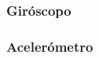 \begin{frame}
    \frametitle{Giróscopo}

\end{frame}

\begin{frame}
    \frametitle{Acelerómetro}

\end{frame}
